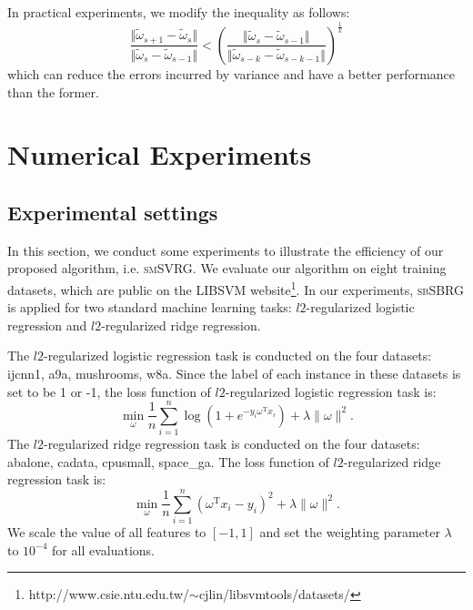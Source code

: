 \documentclass[letterpaper]{article}
\begin{document}
 In practical experiments, we modify the inequality as follows:
 \begin{equation}
 \label{inequality_2}
 \frac{\Vert  \tilde{\omega}_{s+1} - \tilde{\omega}_{s}  \Vert} {\Vert  \tilde{\omega}_{s} - \tilde{\omega}_{s-1}  \Vert}  <(\frac{\Vert \tilde{\omega}_{s} - \tilde{\omega}_{s-1}  \Vert } {\Vert  \tilde{\omega}_{s-k} - \tilde{\omega}_{s-k-1}  \Vert})^\frac{1}{k}
 \end{equation}
 which can reduce the errors incurred by variance and have a better performance than the former.
  
 
 \section{Numerical Experiments}
 \subsection{Experimental settings}
 In this section, we conduct some experiments to illustrate the efficiency of our proposed algorithm, i.e. \textsc{smSVRG}. We evaluate our algorithm on eight training datasets, which are public on the LIBSVM website\footnote{http://www.csie.ntu.edu.tw/$\sim$cjlin/libsvmtools/datasets/}. In our experiments, \textsc{sbSBRG} is applied for two standard machine learning tasks: $l2$-regularized logistic regression and $l2$-regularized ridge regression.
 
 The $l2$-regularized logistic regression task is conducted on the four datasets: ijcnn1, a9a, mushrooms, w8a. Since the label of each instance in these datasets is set to be 1 or -1, the loss function of $l2$-regularized logistic regression task is:
\begin{equation}
\label{logistic_reg}
\min\limits_\omega \frac{1}{n}\sum\limits_{i=1}^n \log(1+e^{-y_i \omega^\mathrm{T} x_i }) + \lambda \parallel \omega \parallel^2.
\end{equation}
The $l2$-regularized ridge regression task is conducted on the four datasets: abalone, cadata, cpusmall, space\_ga. The loss function of $l2$-regularized ridge regression task is:
\begin{equation}
\label{ridge_reg}
\min\limits_\omega \frac{1}{n}\sum\limits_{i=1}^n\left(\omega^{\mathrm{T}}x_i-y_i\right)^2 + \lambda \parallel \omega \parallel^2.
\end{equation}
We scale the value of all features to $[-1,1]$ and set the weighting parameter $\lambda$ to $10^{-4}$ for all evaluations. 
\end{document}

